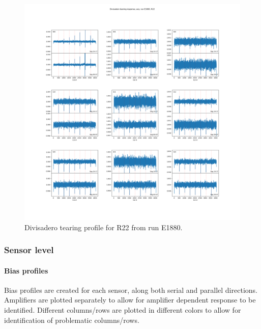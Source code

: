 \begin{figure}
    \centering
    \includegraphics[width=0.8\linewidth]{figures/ReferenceFigures/divisadero_raft_plot_LSSTCam_R22_S00_u_lsstccs_eo_divisadero_tearing_E1880_w_2024_35_20241101T020421Z.png}
    \caption{Divisadero tearing profile for R22 from run E1880.}
    \label{fig:ref:divisaderoProfile}
\end{figure}
\clearpage
\subsubsection{Sensor level}

\paragraph{Bias profiles}

Bias profiles are created for each sensor, along both serial and parallel directions. Amplifiers are plotted separately to allow for amplifier dependent response to be identified. Different columns/rows are plotted in different colors to allow for identification of problematic columns/rows.

